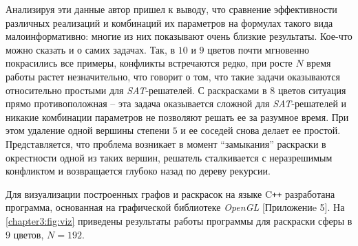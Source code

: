 Анализируя эти данные автор пришел к выводу, что сравнение эффективности различных 
реализаций и комбинаций их параметров на формулах такого вида малоинформативно: 
многие из них показывают очень близкие результаты. 
Кое-что можно сказать и о самих задачах. Так, в $10$ и $9$ цветов почти мгновенно покрасились все примеры, 
конфликты встречаются редко, при росте $N$ время работы растет незначительно, что говорит о том, 
что такие задачи оказываются относительно простыми для \textit{SAT}-решателей.
С раскрасками в $8$ цветов ситуация прямо противоположная -- эта задача оказывается 
сложной для \textit{SAT}-решателей и никакие комбинации параметров не позволяют решать ее за разумное время. 
При этом удаление одной вершины степени $5$ и ее соседей снова делает ее простой. 
Представляется, что проблема возникает в момент \enquote{замыкания} раскраски в окрестности одной из таких вершин, 
решатель сталкивается с неразрешимым конфликтом и возвращается глубоко назад по дереву рекурсии.

Для визуализации построенных графов и раскрасок на языке C\texttt{++} разработана программа, 
основанная на графической библиотеке \textit{OpenGL} [Приложениe 5]. 
На \figurename{ \ref{chapter3:fig:viz}} приведены результаты работы программы для раскраски сферы в $9$ цветов, $N=192$.

